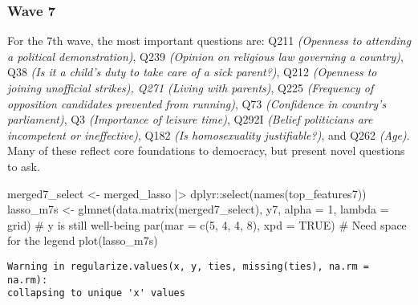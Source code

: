 \documentclass[
  letterpaper,
  DIV=11,
  numbers=noendperiod]{scrartcl}
\newenvironment{Shaded}{\begin{snugshade}}{\end{snugshade}}
\newcommand{\AttributeTok}[1]{\textcolor[rgb]{0.40,0.45,0.13}{#1}}
\newcommand{\CommentTok}[1]{\textcolor[rgb]{0.37,0.37,0.37}{#1}}
\newcommand{\ConstantTok}[1]{\textcolor[rgb]{0.56,0.35,0.01}{#1}}
\newcommand{\DecValTok}[1]{\textcolor[rgb]{0.68,0.00,0.00}{#1}}
\newcommand{\FunctionTok}[1]{\textcolor[rgb]{0.28,0.35,0.67}{#1}}
\newcommand{\NormalTok}[1]{\textcolor[rgb]{0.00,0.23,0.31}{#1}}
\newcommand{\OtherTok}[1]{\textcolor[rgb]{0.00,0.23,0.31}{#1}}
\newcommand{\SpecialCharTok}[1]{\textcolor[rgb]{0.37,0.37,0.37}{#1}}
\begin{document}
\subsubsection{Wave 7}\label{wave-7}

For the 7th wave, the most important questions are: Q211 \emph{(Openness
to attending a political demonstration)}, Q239 \emph{(Opinion on
religious law governing a country)}, Q38 \emph{(Is it a child's duty to
take care of a sick parent?)}, Q212 \emph{(Openness to joining
unofficial strikes), Q271 (Living with parents)}, Q225 \emph{(Frequency
of opposition candidates prevented from running)}, Q73 \emph{(Confidence
in country's parliament)}, Q3 \emph{(Importance of leisure time)}, Q292I
\emph{(Belief politicians are incompetent or ineffective)}, Q182
\emph{(Is homosexuality justifiable?)}, and Q262 \emph{(Age)}. Many of
these reflect core foundations to democracy, but present novel questions
to ask.

\begin{Shaded}
\begin{Highlighting}[]
\NormalTok{merged7\_select }\OtherTok{\textless{}{-}}\NormalTok{ merged\_lasso }\SpecialCharTok{|\textgreater{}}\NormalTok{ dplyr}\SpecialCharTok{::}\FunctionTok{select}\NormalTok{(}\FunctionTok{names}\NormalTok{(top\_features7))}
\NormalTok{lasso\_m7s }\OtherTok{\textless{}{-}} \FunctionTok{glmnet}\NormalTok{(}\FunctionTok{data.matrix}\NormalTok{(merged7\_select), y7, }\AttributeTok{alpha =} \DecValTok{1}\NormalTok{, }\AttributeTok{lambda =}\NormalTok{ grid) }\CommentTok{\# y is still well{-}being}
\FunctionTok{par}\NormalTok{(}\AttributeTok{mar =} \FunctionTok{c}\NormalTok{(}\DecValTok{5}\NormalTok{, }\DecValTok{4}\NormalTok{, }\DecValTok{4}\NormalTok{, }\DecValTok{8}\NormalTok{), }\AttributeTok{xpd =} \ConstantTok{TRUE}\NormalTok{) }\CommentTok{\# Need space for the legend}
\FunctionTok{plot}\NormalTok{(lasso\_m7s)}
\end{Highlighting}
\end{Shaded}

\begin{verbatim}
Warning in regularize.values(x, y, ties, missing(ties), na.rm = na.rm):
collapsing to unique 'x' values
\end{verbatim}
\end{document}
